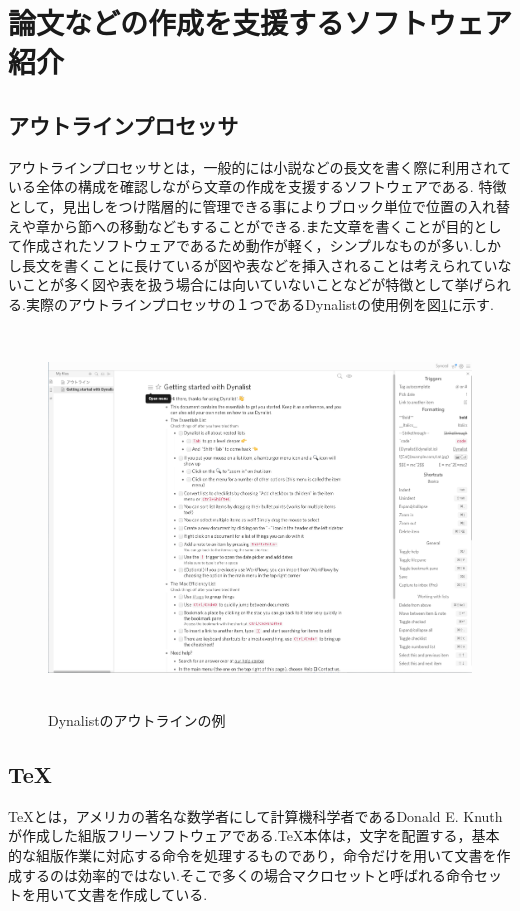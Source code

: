\documentclass[a4j,12pt]{jarticle}
\begin{document}
\newpage

\section{論文などの作成を支援するソフトウェア紹介}
\subsection{アウトラインプロセッサ}
アウトラインプロセッサとは，一般的には小説などの長文を書く際に利用されている全体の構成を確認しながら文章の作成を支援するソフトウェアである.
特徴として，見出しをつけ階層的に管理できる事によりブロック単位で位置の入れ替えや章から節への移動などもすることができる.また文章を書くことが目的として作成されたソフトウェアであるため動作が軽く，シンプルなものが多い.しかし長文を書くことに長けているが図や表などを挿入されることは考えられていないことが多く図や表を扱う場合には向いていないことなどが特徴として挙げられる.実際のアウトラインプロセッサの１つであるDynalistの使用例を図\ref{fig:b}に示す.
\begin{figure}[H]
\begin{center}
 \includegraphics[clip,width=150mm,height=100mm]{figure/Dynalist.png}
 \end{center}
 \caption{Dynalistのアウトラインの例}
 \label{fig:b}
\end{figure}
\newpage
\subsection{\TeX}
\TeX とは，アメリカの著名な数学者にして計算機科学者であるDonald E. Knuthが作成した組版フリーソフトウェアである.TeX本体は，文字を配置する，基本的な組版作業に対応する命令を処理するものであり，命令だけを用いて文書を作成するのは効率的ではない.そこで多くの場合マクロセットと呼ばれる命令セットを用いて文書を作成している.
\end{document}
